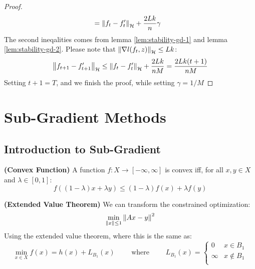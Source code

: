 \begin{proof}
\begin{equation*}
\begin{aligned}
        &= \left\lVert f_t - f_t'\right\rVert_\mathcal{H} + \frac{2Lk}{n}\gamma
    \end{aligned}
    \end{equation*}
    The second ineqalities comes from lemma \ref{lem:stability-gd-1} and lemma \ref{lem:stability-gd-2}. Please note that $\left\lVert\nabla l(f_t, z)\right\rVert_\mathcal{H} \le Lk$:
    \begin{equation*}
        \left\lVert f_{t+1} - f_{t+1}'\right\rVert_\mathcal{H} \le \left\lVert f_t - f_t'\right\rVert_\mathcal{H} + \frac{2Lk}{nM} = \frac{2Lk(t+1)}{nM}
    \end{equation*}
    Setting $t+1 = T$, and we finish the proof, while setting $\gamma = 1/M$
\end{proof}


\section{Sub-Gradient Methods}

\subsection{Introduction to Sub-Gradient}

\begin{definition}{\textbf{(Convex Function)}}
    A function $f:X\rightarrow[-\infty,\infty]$ is convex iff, for all $x, y\in X$ and $\lambda \in [0, 1]$:
    \begin{equation*}
        f((1-\lambda)x + \lambda y) \le (1-\lambda)f(x) + \lambda f(y)
    \end{equation*}
\end{definition}

\begin{definition}{\textbf{(Extended Value Theorem)}}
    We can transform the constrained optimization:
    \begin{equation*}
        \min_{\left\lVert x\right\rVert\le1}\left\lVert Ax-y\right\rVert^2
    \end{equation*}
    Using the extended value theorem, where this is the same as:
    \begin{equation*}
        \min_{x\in X} f(x) = h(x) + L_{B_1}(x) \qquad \text{ where } \qquad L_{B_1}(x) = \begin{cases}
            0 & x\in B_1 \\
            \infty & x\not\in B_1 \\
        \end{cases}
    \end{equation*}
\end{definition}

